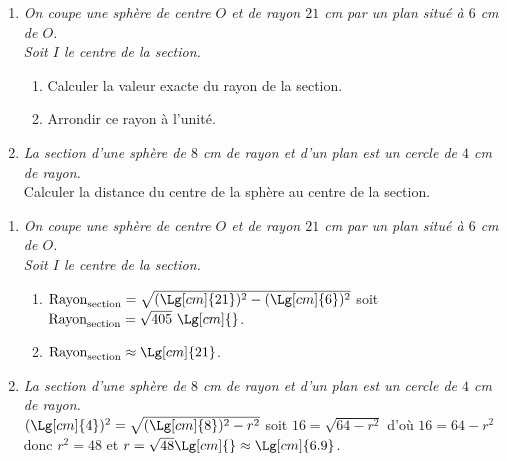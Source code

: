 \begin{methode*1}[Applications]
    \exercice
    \begin{enumerate}
        \item \textit{On coupe une sphère de centre $O$ et de rayon $21$ cm par un plan situé à $6$ cm de $O$.\\Soit $I$ le centre de la section.}
        \begin{enumerate}
            \item Calculer la valeur exacte du rayon de la section.
            \item Arrondir ce rayon à l'unité.
        \end{enumerate}
        \item \textit{La section d'une sphère de $8$ cm de rayon et d'un plan est un cercle de $4$ cm de rayon.}\\
        Calculer la distance du centre de la sphère au centre de la section.
    \end{enumerate}
    \correction
    \begin{enumerate}
        \item \textit{On coupe une sphère de centre $O$ et de rayon $21$ cm par un plan situé à $6$ cm de $O$.\\Soit $I$ le centre de la section.}
        \begin{enumerate}
            \item $\text{Rayon}_{\text{section}}=\sqrt{(\Lg[cm]{21})^2-(\Lg[cm]{6})^2}$ soit $\text{Rayon}_{\text{section}}=\sqrt{405}~\Lg[cm]{}$.
            \item $\text{Rayon}_{\text{section}}\approx\Lg[cm]{21}$.
        \end{enumerate}
        \item \textit{La section d'une sphère de $8$ cm de rayon et d'un plan est un cercle de $4$ cm de rayon.}\\
        $(\Lg[cm]{4})^2=\sqrt{(\Lg[cm]{8})^2-r^2}$ soit $16=\sqrt{64-r^2}$ d'où $16=64-r^2$ donc $r^2=48$ et $r=\sqrt{48}\Lg[cm]{}\approx\Lg[cm]{6.9}$.
    \end{enumerate}
\end{methode*1}

